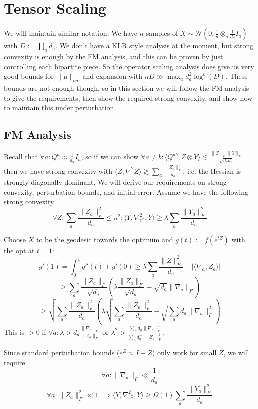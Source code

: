 \documentclass{article}
\begin{document}
\section{Tensor Scaling}
We will maintain similar notation. We have $n$ samples of $X \sim \mathcal{N}(0,\frac{1}{n} \otimes_{a} \frac{1}{d_{a}} I_{a})$ with $D := \prod_{a} d_{a}$. We don't have a KLR style analysis at the moment, but strong convexity is enough by the FM analysis, and this can be proven by just controlling each bipartite piece. So the operator scaling analysis does give us very good bounds for $\|\mu\|_{op}$ and expansion with $nD \gg \max_{a} d_{a}^{2} \log^{c}(D)$. These bounds are not enough though, so in this section we will follow the FM analysis to give the requirements, then show the required strong convexity, and show how to maintain this under perturbation.

\subsection{FM Analysis}
Recall that $\forall a: Q^{a} \approx \frac{1}{d_{a}} I_{a}$, so if we can show $\forall a \neq b: \langle Q^{ab}, Z \otimes Y \rangle \lesssim \frac{\|Z\|_{F} \|Y\|_{F}}{\sqrt{d_{a} d_{b}}}$ then we have strong convexity with $\langle Z, \nabla^{2} Z \rangle \gtrsim \sum_{a} \frac{\|Z_{a}\|_{F}^{2}}{d_{a}}$, i.e. the Hessian is strongly diagonally dominant. We will derive our requirements on strong convexity, perturbation bounds, and initial error. Assume we have the following strong convexity
\[ \forall Z: \sum_{a} \frac{\|Z_{a}\|_{F}^{2}}{d_{a}} \leq \kappa^{2}: \langle Y, \nabla^{2}_{e^{Z}}, Y \rangle \geq \lambda \sum_{a} \frac{\|Y_{a}\|_{F}^{2}}{d_{a}}  \]

Choose $X$ to be the geodesic towards the optimum and $g(t) := f(e^{tZ})$ with the opt at $t=1$:
\[ g'(1) = \int_{0}^{1} g''(t) + g'(0) \geq \lambda \sum_{a} \frac{\|Z\|_{F}^{2}}{d_{a}} - |\langle \nabla_{a}, Z_{a} \rangle| \]
\[ \geq \sum_{a} \frac{\|Z_{a}\|_{F}}{\sqrt{d_{a}}} \left( \lambda \frac{\|Z_{a}\|_{F}}{\sqrt{d_{a}}} - \sqrt{d_{a}} \|\nabla_{a}\|_{F}  \right)  \]
\[ \geq \sqrt{\sum_{a} \frac{\|Z_{a}\|_{F}^{2}}{d_{a}}} \left( \lambda \sqrt{\sum_{a} \frac{\|Z_{a}\|_{F}^{2}}{d_{a}}} - \sqrt{\sum_{a} d_{a} \|\nabla_{a}\|_{F}^{2}} \right)  \]
This is $> 0$ if $\forall a: \lambda > d_{a} \frac{\|\nabla_{a}\|_{F}}{\|Z_{a}\|_{F}}$ or $\lambda^{2} > \frac{ \sum_{a} d_{a} \|\nabla_{a}\|_{F}^{2} }{\sum_{a} d_{a}^{-1} \|Z_{a}\|_{F}^{2}} $.

Since standard perturbation bounds ($e^{Z} \approx I + Z$) only work for small $Z$, we will require
\[ \forall a: \|\nabla_{a}\|_{F} \ll \frac{1}{d_{a}} \]
\[ \forall a: \|Z_{a}\|_{F}^{2} \ll 1 \implies \langle Y, \nabla_{e^{Z}}^{2}, Y \rangle \geq \Omega(1) \sum_{a} \frac{\|Y_{a}\|_{F}^{2}}{d_{a}}   \]
\end{document}
